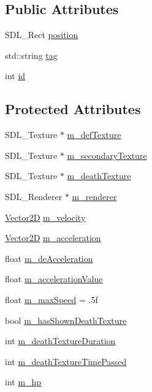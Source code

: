 \subsection*{Public Attributes}
\begin{DoxyCompactItemize}
\item 
S\+D\+L\+\_\+\+Rect \mbox{\hyperlink{class_game_object_af6009d73be98a4bd54272d06b50f2eac}{position}}
\item 
std\+::string \mbox{\hyperlink{class_game_object_a66891b8bfd67373dde0155ae7808bbb4}{tag}}
\item 
int \mbox{\hyperlink{class_game_object_a98291c60da12d9036e1ad24cfebcf6b3}{id}}
\end{DoxyCompactItemize}
\subsection*{Protected Attributes}
\begin{DoxyCompactItemize}
\item 
S\+D\+L\+\_\+\+Texture $\ast$ \mbox{\hyperlink{class_game_object_a5202d5d5df1813c567fb344617250b42}{m\+\_\+def\+Texture}}
\item 
S\+D\+L\+\_\+\+Texture $\ast$ \mbox{\hyperlink{class_game_object_aa89e916d62813d047b054c0c9cf97559}{m\+\_\+secondary\+Texture}}
\item 
S\+D\+L\+\_\+\+Texture $\ast$ \mbox{\hyperlink{class_game_object_a585ecfe9ee67a81264e2e414dbba80dd}{m\+\_\+death\+Texture}}
\item 
S\+D\+L\+\_\+\+Renderer $\ast$ \mbox{\hyperlink{class_game_object_a2be93417ea72201ce5edc093167b2f68}{m\+\_\+renderer}}
\item 
\mbox{\hyperlink{struct_game_object_1_1_vector2_d}{Vector2D}} \mbox{\hyperlink{class_game_object_ac27549efb645f7c924d6604e318877bf}{m\+\_\+velocity}}
\item 
\mbox{\hyperlink{struct_game_object_1_1_vector2_d}{Vector2D}} \mbox{\hyperlink{class_game_object_a934563079577e8f20b597e23ae40ec20}{m\+\_\+acceleration}}
\item 
float \mbox{\hyperlink{class_game_object_a82b60a9ea631d253434ba8683ee69370}{m\+\_\+de\+Acceleration}}
\item 
float \mbox{\hyperlink{class_game_object_a6a2eccbbf7974ae9d76e58f4f5b899ac}{m\+\_\+acceleration\+Value}}
\item 
float \mbox{\hyperlink{class_game_object_a13670cbe19b2daaedbd696a3495bf598}{m\+\_\+max\+Speed}} = .\+5f
\item 
bool \mbox{\hyperlink{class_game_object_a23bb632b062159fd2038ad1ba90c3cba}{m\+\_\+has\+Shown\+Death\+Texture}}
\item 
int \mbox{\hyperlink{class_game_object_abf206053b21dce61fcb5d20b4273b7c6}{m\+\_\+death\+Texture\+Duration}}
\item 
int \mbox{\hyperlink{class_game_object_a425076c967951b2f01b9fa8fdfe6dc2c}{m\+\_\+death\+Texture\+Time\+Passed}}
\item 
int \mbox{\hyperlink{class_game_object_a26687f9a79576969707c47f5562b7037}{m\+\_\+hp}}
\end{DoxyCompactItemize}


